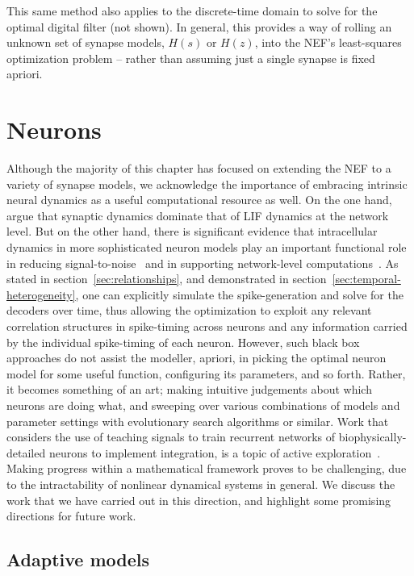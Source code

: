 This same method also applies to the discrete-time domain to solve for the optimal digital filter (not shown).
In general, this provides a way of rolling an unknown set of synapse models, $H(s)$ or $H(z)$, into the NEF's least-squares optimization problem -- rather than assuming just a single synapse is fixed apriori.


\section{Neurons}
\label{sec:neurons}

Although the majority of this chapter has focused on extending the NEF to a variety of synapse models,
we acknowledge the importance of embracing intrinsic neural dynamics as a useful computational resource as well.
On the one hand, \citet[][appendix~F.1]{eliasmith2003a} argue that synaptic dynamics dominate that of LIF dynamics at the network level.
But on the other hand, there is significant evidence that intracellular dynamics in more sophisticated neuron models play an important functional role in reducing signal-to-noise~\citep[][chapter~4]{eliasmith2003a} and in supporting network-level computations~\citep{izhikevich2007dynamical}.
As stated in section~\ref{sec:relationships}, and demonstrated in section~\ref{sec:temporal-heterogeneity}, one can explicitly simulate the spike-generation and solve for the decoders over time, thus allowing the optimization to exploit any relevant correlation structures in spike-timing across neurons and any information carried by the individual spike-timing of each neuron.
However, such black box approaches do not assist the modeller, apriori, in picking the optimal neuron model for some useful function, configuring its parameters, and so forth.
Rather, it becomes something of an art; making intuitive judgements about which neurons are doing what, and sweeping over various combinations of models and parameter settings with evolutionary search algorithms or similar.
Work that considers the use of teaching signals to train recurrent networks of biophysically-detailed neurons to implement integration, is a topic of active exploration~\citep{duggins2017incorporating, duggins2017b}.
Making progress within a mathematical framework proves to be challenging, due to the intractability of nonlinear dynamical systems in general.
We discuss the work that we have carried out in this direction, and highlight some promising directions for future work.

\subsection{Adaptive models}
\label{sec:adaptive-neurons}

